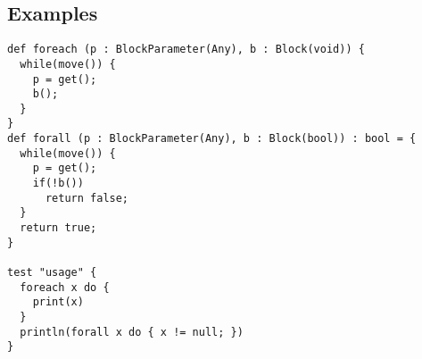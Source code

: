 \subsection{Examples}

\begin{lstlisting}[language=tyr]
def foreach (p : BlockParameter(Any), b : Block(void)) {
  while(move()) {
	p = get();
	b();
  }
}
def forall (p : BlockParameter(Any), b : Block(bool)) : bool = {
  while(move()) {
    p = get();
    if(!b())
      return false;
  }
  return true;
}

test "usage" {
  foreach x do {
    print(x)
  }
  println(forall x do { x != null; })
}
\end{lstlisting}
